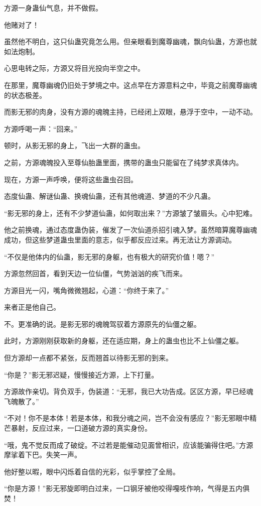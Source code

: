 \begin{this_body}
方源一身蛊仙气息，并不做假。

他赌对了！

虽然他不明白，这只仙蛊究竟怎么用。但亲眼看到魔尊幽魂，飘向仙蛊，方源也就如法炮制。

心思电转之际，方源又将目光投向半空之中。

在那里，魔尊幽魂仍旧处于梦境之中。这点早在方源意料之中，毕竟之前魔尊幽魂的状态极差。

而影无邪的肉身，没有方源的魂魄主持，已经闭上双眼，悬浮于空中，一动不动。

方源呼喝一声：“回来。”

顿时，从影无邪的身上，飞出一大群的蛊虫。

之前，方源魂魄投入至尊仙胎蛊里面，携带的蛊虫只能留在了纯梦求真体内。

现在，方源一声呼唤，便将这些蛊虫召回。

态度仙蛊、解谜仙蛊、换魂仙蛊，还有其他魂道、梦道的不少凡蛊。

“影无邪的身上，还有不少梦道仙蛊，如何取出来？”方源皱了皱眉头。心中犯难。

他之前换魂，通过态度蛊伪装，催发了一次仙道杀招引魂入梦。虽然暗算魔尊幽魂成功，但这些梦道蛊虫里面的意志，似乎都反应过来。再无法让方源调动。

“不仅是他体内的仙蛊，影无邪的身躯，也有极大的研究价值！嗯？”

方源忽然回首，看到天边一位仙僵，气势汹汹的疾飞而来。

方源目光一闪，嘴角微微翘起，心道：“你终于来了。”

来者正是他自己。

不。更准确的说。是影无邪的魂魄驾驭着方源原先的仙僵之躯。

此时，方源刚刚获取新的身躯，还在适应期，身上的蛊虫也比不上仙僵之躯。

但方源却一点都不紧张，反而翘首以待影无邪的到来。

“你是？”影无邪迟疑，慢慢接近方源，上下打量。

方源故作亲切。背负双手，伪装道：“无邪，我已大功告成。区区方源，早已经魂飞魄散了。”

“不对！你不是本体！若是本体，和我分魂之间，岂不会没有感应？”影无邪眼中精芒暴射，反应过来，一口道破方源的真实身份。

“哦，鬼不觉反而成了破绽。不过若是能催动见面曾相识，应该能骗得住吧。”方源摩挲着下巴。失笑一声。

他好整以暇，眼中闪烁着自信的光彩，似乎掌控了全局。

“你是方源！”影无邪旋即明白过来，一口钢牙被他咬得嘎吱作响，气得是五内俱焚！


\end{this_body}
